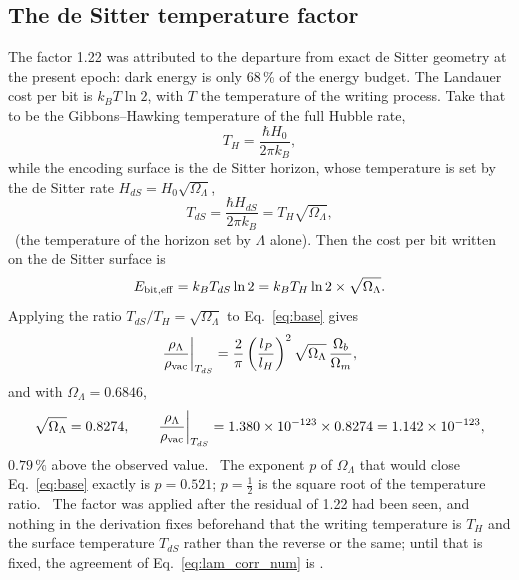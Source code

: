 \subsection{The de Sitter temperature factor}\label{sec:lam_tds}
The factor 1.22 was attributed to the departure from exact de Sitter geometry at the present epoch: dark energy is only 68\,\% of the
energy budget. The Landauer cost per bit is $k_BT\ln2$, with $T$ the temperature of the writing process. Take that to be the
Gibbons--Hawking temperature of the full Hubble rate,
\begin{equation}T_H=\frac{\hbar H_0}{2\pi k_B},\label{eq:lam_TH}\end{equation}
while the encoding surface is the de Sitter horizon, whose temperature is set by the de Sitter rate $H_{dS}=H_0\sqrt{\Omega_\Lambda}$,
\begin{equation}T_{dS}=\frac{\hbar H_{dS}}{2\pi k_B}=T_H\sqrt{\Omega_\Lambda},\label{eq:lam_TdS}\end{equation}
\derived\ (the temperature of the horizon set by $\Lambda$ alone). Then the cost per bit written on the de Sitter surface is
\begin{equation}E_{\rm bit,eff}=k_BT_{dS}\ln2=k_BT_H\ln2\times\sqrt{\Omega_\Lambda}.\label{eq:lam_Eeff}\end{equation}
Applying the ratio $T_{dS}/T_H=\sqrt{\Omega_\Lambda}$ to Eq.~\eqref{eq:base} gives
\begin{equation}
\frac{\rho_\Lambda}{\rho_{\rm vac}}\bigg|_{T_{dS}}=\frac{2}{\pi}\left(\frac{l_P}{l_H}\right)^2\sqrt{\Omega_\Lambda}\,\frac{\Omega_b}{\Omega_m},
\label{eq:corr}\end{equation}
and with $\Omega_\Lambda=0.6846$,
\begin{equation}
\sqrt{\Omega_\Lambda}=0.8274,\qquad \frac{\rho_\Lambda}{\rho_{\rm vac}}\bigg|_{T_{dS}}=1.380\times10^{-123}\times0.8274=1.142\times10^{-123},
\label{eq:lam_corr_num}\end{equation}
$0.79\,\%$ above the observed value. \calc\ The exponent $p$ of $\Omega_\Lambda$ that would close Eq.~\eqref{eq:base} exactly is
$p=0.521$; $p=\tfrac12$ is the square root of the temperature ratio. \calc\ The factor was applied after the residual of 1.22 had
been seen, and nothing in the derivation fixes beforehand that the writing temperature is $T_H$ and the surface temperature $T_{dS}$
rather than the reverse or the same; until that is fixed, the agreement of Eq.~\eqref{eq:lam_corr_num} is \fitted.

